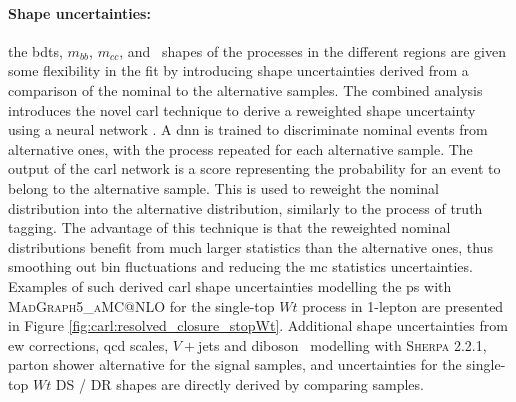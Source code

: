 \paragraph{Shape uncertainties:} the \glspl{bdt}, $m_{bb}$, $m_{cc}$, and \ptv\ shapes of the processes in the different regions are given some flexibility in the fit by introducing shape uncertainties derived from a comparison of the nominal to the alternative samples. The combined analysis introduces the novel \gls{carl} technique to derive a reweighted shape uncertainty using a neural network \cite{carl}. A \gls{dnn} is trained to discriminate nominal events from alternative ones, with the process repeated for each alternative sample. The output of the \gls{carl} network is a score representing the probability for an event to belong to the alternative sample. This is used to reweight the nominal distribution into the alternative distribution, similarly to the process of truth tagging. The advantage of this technique is that the reweighted nominal distributions benefit from much larger statistics than the alternative ones, thus smoothing out bin fluctuations and reducing the \gls{mc} statistics uncertainties. Examples of such derived \gls{carl} shape uncertainties modelling the \gls{ps} with \textsc{MadGraph5\_aMC@NLO} for the single-top $Wt$ process in 1-lepton are presented in Figure \ref{fig:carl:resolved_closure_stopWt}. Additional shape uncertainties from \gls{ew} corrections, \gls{qcd} scales, $V+$jets and diboson \ptv\ modelling with \textsc{Sherpa} 2.2.1, parton shower alternative for the signal samples, and uncertainties for the single-top $Wt$ DS / DR shapes are directly derived by comparing samples.

